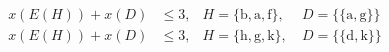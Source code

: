 \begin{align*}
x(E(H)) + x(D) &\leq 3, & H= \{\text{b},\text{a},\text{f}\},\ & D=\{\{\text{a},\text{g}\}\}\\
x(E(H)) + x(D) &\leq 3, & H= \{\text{h},\text{g},\text{k}\},\ & D=\{\{\text{d},\text{k}\}\}\\
\end{align*}
